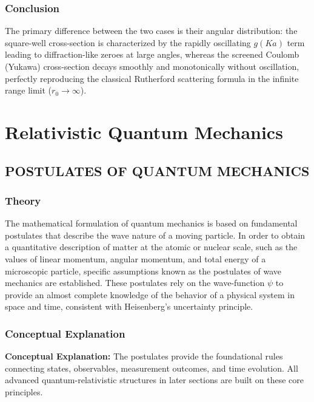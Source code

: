 \documentclass[12pt]{report}
\begin{document}
\subsection*{Conclusion}
The primary difference between the two cases is their angular distribution: the square-well cross-section is characterized by the rapidly oscillating $g(Ka)$ term leading to diffraction-like zeroes at large angles, whereas the screened Coulomb (Yukawa) cross-section decays smoothly and monotonically without oscillation, perfectly reproducing the classical Rutherford scattering formula in the infinite range limit ($r_0 \to \infty$).


\chapter{Relativistic Quantum Mechanics}

\section{POSTULATES OF QUANTUM MECHANICS}



\subsection*{Theory}

The mathematical formulation of quantum mechanics is based on fundamental postulates that describe the wave nature of a moving particle. In order to obtain a quantitative description of matter at the atomic or nuclear scale, such as the values of linear momentum, angular momentum, and total energy of a microscopic particle, specific assumptions known as the postulates of wave mechanics are established. These postulates rely on the wave-function $\psi$ to provide an almost complete knowledge of the behavior of a physical system in space and time, consistent with Heisenberg's uncertainty principle.


\subsection{Conceptual Explanation}
\textbf{Conceptual Explanation:} The postulates provide the foundational rules connecting states, observables, measurement outcomes, and time evolution. All advanced quantum-relativistic structures in later sections are built on these core principles.
\end{document}
